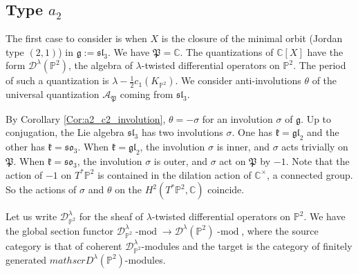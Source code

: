 \documentclass[12pt]{amsart}
\newcommand{\C}{\mathbb{C}}
\newcommand{\A}{\mathcal{A}}
\newcommand{\g}{\mathfrak{g}}
\newcommand{\gr}{\operatorname{gr}}
\newcommand{\kf}{\mathfrak{k}}
\newcommand{\HC}{\operatorname{HC}}
\newcommand{\Pb}{\mathbb{P}}
\newcommand{\param}{\mathfrak{P}}
\theoremstyle{definition}
\numberwithin{equation}{section}
\begin{document}
\subsection{Type $a_2$}\label{SS_type_a2}
The first case to consider is when $X$ is the closure of the minimal orbit (Jordan type $(2,1)$)
in $\g:=\mathfrak{sl}_3$. We have $\param=\C$. The quantizations of $\C[X]$ have the form
$\mathscr{D}^{\lambda}(\mathbb{P}^2)$, the algebra of $\lambda$-twisted
differential operators on $\mathbb{P}^2$. The period of such a quantization is $\lambda-\frac{1}{2}c_1(K_{\mathbb{P}^2})$. We consider anti-involutions $\theta$ of the universal quantization $\A_\param$ coming from $\mathfrak{sl}_3$.

By Corollary \ref{Cor:a2_c2_involution}, $\theta=-\sigma$ for an involution $\sigma$ of $\g$.
Up to conjugation, the Lie algebra $\mathfrak{sl}_3$ has two involutions
$\sigma$. One has $\kf=\mathfrak{gl}_2$ and the other has $\kf=\mathfrak{so}_3$. When $\kf=\mathfrak{gl}_2$,
the involution $\sigma$ is inner, and $\sigma$ acts trivially
on $\param$. When $\kf=\mathfrak{so}_3$, the involution $\sigma$ is outer, and
$\sigma$ act on $\param$ by $-1$. Note that the  action of $-1$ on $T^*\mathbb{P}^2$
is contained in the dilation action of $\C^\times$, a connected group. So the actions of
$\sigma$ and $\theta$ on the $H^2(T^*\mathbb{P}^2,\C)$ coincide.

Let us write $\mathscr{D}^\lambda_{\Pb^2}$ for the sheaf of $\lambda$-twisted
differential operators on $\Pb^2$. We have the global section
functor $\mathscr{D}^\lambda_{\Pb^2}\operatorname{-mod} \rightarrow \mathscr{D}^\lambda(\Pb^2)\operatorname{-mod}$,
where the source category is that of coherent $\mathscr{D}^\lambda_{\Pb^2}$-modules and the target is the category
of finitely generated $mathscr{D}^\lambda(\Pb^2)$-modules.
\end{document}
